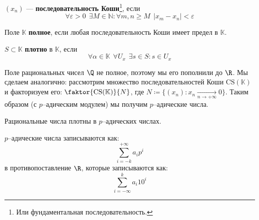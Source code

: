 \begin{definition}
	\((x_n)\) --- \textbf{последовательность Коши}\footnote{Или фундаментальная последовательность.}, если
	\[\forall \varepsilon > 0 \ \ \exists M \in \mathbb{N} : \forall m, n \ge M \ \ |x_m - x_n| < \varepsilon\]
\end{definition}

\begin{definition}
	Поле \(\mathbb{K}\) \textbf{полное}, если любая последовательность Коши имеет предел в \(\mathbb{K}\).
\end{definition}

\begin{definition}
	\(S \subset \mathbb{K}\) \textbf{плотно} в \(\mathbb{K}\), если
	\[\forall \alpha \in \mathbb{K} \ \ \forall U_x \ \ \exists s \in S : s \in U_x\]
\end{definition}

Поле рациональных чисел \(\Q\) не полное, поэтому мы его пополнили до \(\R\). Мы сделаем аналогично:
рассмотрим множество последовательностей Коши \(\mathrm{CS}(\mathbb{K})\)
и факторизуем его: \(\faktor{\mathrm{CS}(\mathbb{K})}{N}\),
где \(N \coloneqq \{(x_n) : x_n \xrightarrow[n \to +\infty]{} 0\}\).
Таким образом (с \(p\)--адическим модулем) мы получим \(p\)--адические числа.

\begin{remark}
    Рациональные числа плотны в \(p\)--адических числах.
\end{remark}

\(p\)--адические числа записываются как:
\[\sum_{i=-k}^{+\infty} a_i p^i\]
в противопоставление \(\R\), которые записываются как:
 \[\sum_{i=-\infty}^k a_i 10^i\] 
